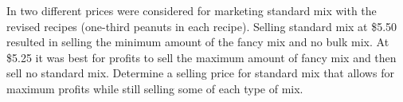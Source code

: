 In  two different prices were considered for marketing standard mix with the revised recipes (one-third peanuts in each recipe).  Selling standard mix at \$5.50 resulted in selling the minimum amount of the fancy mix and no bulk mix.  At \$5.25 it was best for profits to sell the maximum amount of fancy mix and then sell no standard mix.  Determine a selling price for standard mix that allows for maximum profits while still selling some of each type of mix.